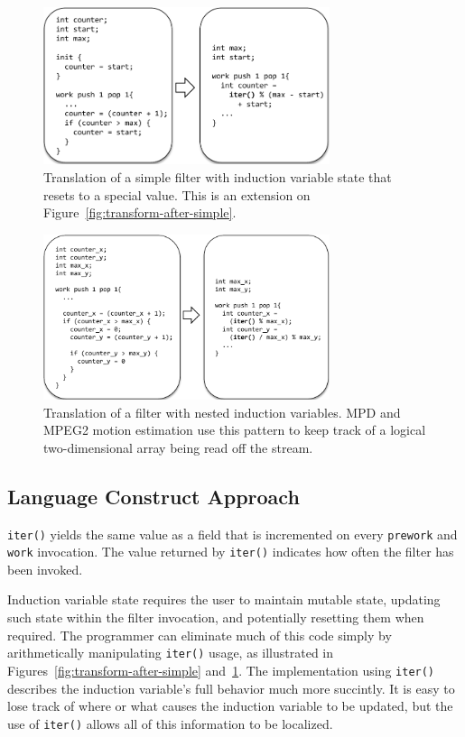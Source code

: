 \begin{figure}[h]
\includegraphics[width=3.3in]{figures/transformation2.pdf}
\caption{Translation of a simple filter with induction variable state
  that resets to a special value.  This is an extension on
  Figure~\ref{fig:transform-after-simple}.
  \protect\label{fig:transform-after-start}
}
\vspace{-10pt}
\end{figure}

\begin{figure}[h]
\includegraphics[width=3.3in]{figures/transformation3.pdf}
\caption{Translation of a filter with nested induction variables. MPD and MPEG2 motion estimation use this pattern to keep track of a logical two-dimensional array being read off the stream.  \protect\label{fig:transform-after-twonested}}
\end{figure}



\subsection{Language Construct Approach}
{\tt iter()} yields the same value as a field that is incremented on every {\tt prework} and {\tt work} invocation.  The value returned by {\tt iter()} indicates how often the filter has been invoked.  

Induction variable state requires the user to maintain mutable state, updating such state within the filter invocation, and potentially resetting them when required. The programmer can eliminate much of this code simply by arithmetically manipulating {\tt iter()} usage, as illustrated in Figures~\ref{fig:transform-after-simple} and~\ref{fig:transform-after-start}.  The implementation using {\tt iter()} describes the induction variable's full behavior much more succintly.  It is easy to lose track of where or what causes the induction variable to be updated, but the use of {\tt iter()} allows all of this information to be localized.

